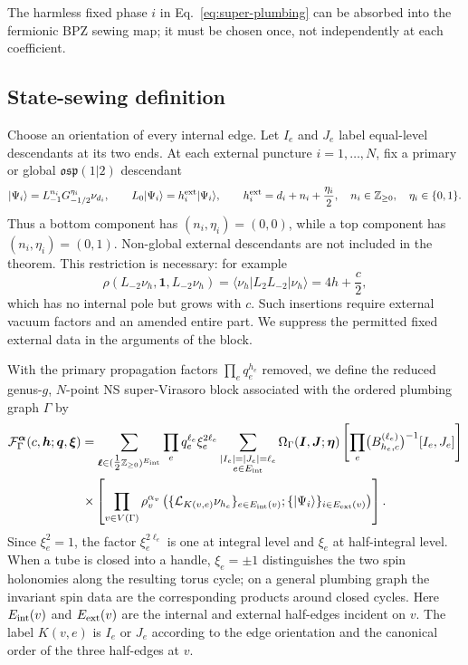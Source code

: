 \documentclass[11pt]{article}
\newcommand{\osp}{\mathfrak{osp}(1|2)}
\newcommand{\F}{\mathcal F}
\newcommand{\half}{\tfrac12}
\begin{document}
The harmless fixed phase \(i\) in Eq.~\eqref{eq:super-plumbing} can be
absorbed into the fermionic BPZ sewing map; it must be chosen once, not
independently at each coefficient.

\subsection{State-sewing definition}

Choose an orientation of every internal edge.  Let \(I_e\) and \(J_e\)
label equal-level descendants at its two ends.  At each external puncture
\(i=1,\ldots,N\), fix a primary or global \(\osp\) descendant
\begin{equation}
 |\Psi_i\rangle=L_{-1}^{n_i}G_{-1/2}^{\eta_i}\nu_{d_i},
 \qquad
 L_0|\Psi_i\rangle=h_i^{\rm ext}|\Psi_i\rangle,
 \qquad
 h_i^{\rm ext}=d_i+n_i+\frac{\eta_i}{2},
 \quad n_i\in\mathbb Z_{\geq0},\quad\eta_i\in\{0,1\}.
 \label{eq:fixed-external-state}
\end{equation}
Thus a bottom component has \((n_i,\eta_i)=(0,0)\), while a top component has
\((n_i,\eta_i)=(0,1)\).  Non-global external descendants are not included in
the theorem.  This restriction is necessary: for example
\begin{equation}
 \rho(L_{-2}\nu_h,\mathbf1,L_{-2}\nu_h)
 =\langle\nu_h|L_2L_{-2}|\nu_h\rangle=4h+\frac c2,
 \label{eq:non-global-external-counterexample}
\end{equation}
which has no internal pole but grows with \(c\).  Such insertions require
external vacuum factors and an amended entire part.  We suppress the permitted
fixed external data in the arguments of the block.

With the primary propagation factors \(\prod_e q_e^{h_e}\) removed, we
define the reduced genus-\(g\), \(N\)-point NS super-Virasoro block associated
with the ordered plumbing graph \(\Gamma\) by
\begin{multline}
 \F_{\Gamma}^{\bm\alpha}
 (c,\bm h;\bm q,\bm\xi)
 =\sum_{\bm\ell\in(\half\mathbb Z_{\ge0})^{E_{\rm int}}}
 \prod_e q_e^{\ell_e}\xi_e^{2\ell_e}
 \sum_{\substack{|I_e|=|J_e|=\ell_e\\e\in E_{\rm int}}}
 \Omega_\Gamma(\bm I,\bm J;\bm\eta)
 \left[\prod_e
  \bigl(B_{h_e,c}^{(\ell_e)}\bigr)^{-1}[I_e,J_e]
 \right]
 \\
 \times
 \left[\prod_{v\in V(\Gamma)}
  \rho_v^{\alpha_v}
  \left(\{\mathcal L_{K(v,e)}\nu_{h_e}\}_{e\in E_{\rm int}(v)};
        \{|\Psi_i\rangle\}_{i\in E_{\rm ext}(v)}\right)
 \right].
 \label{eq:graph-block}
\end{multline}
Since \(\xi_e^2=1\), the factor \(\xi_e^{2\ell_e}\) is one at integral
level and \(\xi_e\) at half-integral level.  When a tube is closed into a
handle, \(\xi_e=\pm1\) distinguishes the two spin holonomies along the
resulting torus cycle; on a general plumbing graph the invariant spin data
are the corresponding products around closed cycles.  Here
\(E_{\rm int}(v)\) and \(E_{\rm ext}(v)\) are the internal and external
half-edges incident on \(v\).  The label \(K(v,e)\) is \(I_e\) or \(J_e\)
according to the edge orientation and the canonical order of the three
half-edges at \(v\).
\end{document}
